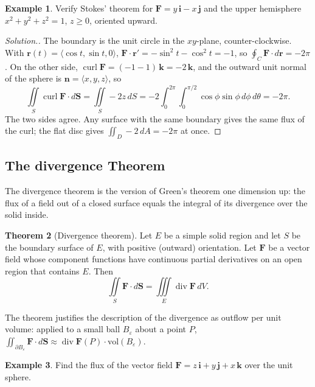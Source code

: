 \documentclass[11pt,a4paper]{article}
\DeclareMathOperator{\dive}{div}
\DeclareMathOperator{\curl}{curl}
\theoremstyle{definition}
\newtheorem{thm}{Theorem}[subsection]
\newtheorem{exa}[thm]{Example}
\newenvironment{solution}
  {\renewcommand{\qedsymbol}{}\begin{proof}[\textit{Solution}.]}
  {\end{proof}}
\begin{document}
\begin{exa}
\label{ex:stokeshemisphere}
Verify Stokes' theorem for $\mathbf F = y\,\mathbf i - x\,\mathbf j$ and the
upper hemisphere $x^2 + y^2 + z^2 = 1$, $z\geq 0$, oriented upward.
\end{exa}

\begin{solution}
The boundary is the unit circle in the $xy$-plane, counter-clockwise. With
$\mathbf r(t) = \langle\cos t,\sin t, 0\rangle$, $\mathbf F\cdot\mathbf r' =
-\sin^2 t - \cos^2t = -1$, so $\oint_C\mathbf F\cdot d\mathbf r = -2\pi$. On the
other side, $\curl\mathbf F = (-1 - 1)\,\mathbf k = -2\,\mathbf k$, and the
outward unit normal of the sphere is $\mathbf n = \langle x,y,z\rangle$, so
\[\iint\limits_S\curl\mathbf F\cdot d\mathbf S = \iint\limits_S -2z\,dS =
-2\int_0^{2\pi}\int_0^{\pi/2}\cos\phi\sin\phi\,d\phi\,d\theta = -2\pi .\]
The two sides agree. Any surface with the same boundary gives the same flux of
the curl; the flat disc gives $\iint_D -2\,dA = -2\pi$ at once.
\end{solution}

{\color[wave]{485}\subsection{The divergence Theorem}}

The divergence theorem is the version of Green's theorem one dimension up: the
flux of a field out of a closed surface equals the integral of its divergence
over the solid inside.

\begin{thm}[Divergence theorem]
\label{thm:divergence}
Let $E$ be a simple solid region and let $S$ be the boundary surface of $E$,
with positive (outward) orientation. Let $\mathbf F$ be a vector field whose
component functions have continuous partial derivatives on an open region that
contains $E$. Then
\[\iint\limits_S \mathbf F\cdot d\mathbf S = \iiint\limits_E \dive \mathbf F\,
dV .\]
\end{thm}

The theorem justifies the description of the divergence as outflow per unit
volume: applied to a small ball $B_\varepsilon$ about a point $P$,
$\iint_{\partial B_\varepsilon}\mathbf F\cdot d\mathbf S\approx
\dive\mathbf F(P)\cdot\text{vol}(B_\varepsilon)$.

\begin{exa}
\label{ex:divsphere}
Find the flux of the vector field $\mathbf F = z\,\mathbf i + y\,\mathbf j +
x\,\mathbf k$ over the unit sphere.
\end{exa}
\end{document}
